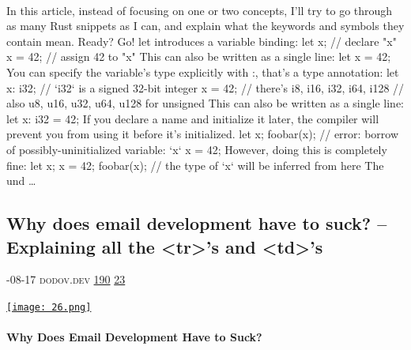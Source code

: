 \documentclass[10pt,a4paper]{article}
\begin{document}
\begin{multicols}{2}
\paragraph{}

In this article, instead of focusing on one or two concepts, I'll try to go through as many Rust snippets as I can, and explain what the keywords and symbols they contain mean.
Ready? Go!
let introduces a variable binding:
let x; // declare "x" x = 42; // assign 42 to "x"
This can also be written as a single line:
let x = 42;
You can specify the variable's type explicitly with
:, that's a type annotation:
let x: i32; // `i32` is a signed 32-bit integer x = 42; // there's i8, i16, i32, i64, i128 // also u8, u16, u32, u64, u128 for unsigned
This can also be written as a single line:
let x: i32 = 42;
If you declare a name and initialize it later, the compiler will prevent you from using it before it's initialized.
let x; foobar(x); // error: borrow of possibly-uninitialized variable: `x` x = 42;
However, doing this is completely fine:
let x; x = 42; foobar(x); // the type of `x` will be inferred from here
The und
\dots\par
\noindent\begin{minipage}{\linewidth}
\medskip
\subsection{Why does email development have to suck? – Explaining all the <tr>'s and <td>'s}
\textsc{\footnotesize
{\scriptsize\faCalendar}-08-17 
{\scriptsize\faGlobe}\space 
dodov.dev 
{\scriptsize\faThumbsOUp}\space 
\href{http://news.ycombinator.com/item?id=37163784\&utm\_term=comment}{190} 
{\scriptsize\faComments}\space 
\href{http://news.ycombinator.com/item?id=37163784\&utm\_term=comment}{23} 
}
\par\medskip\noindent
\href{https://dodov.dev/blog/why-does-email-development-have-to-suck?utm\_source=hackernewsletter\&utm\_medium=email\&utm\_term=code}{
    \texttt{[image: 26.png]}
}
\end{minipage}
\paragraph{}
\textbf{Why Does Email Development Have to Suck?}
\paragraph{}


\end{multicols}
\end{document}
